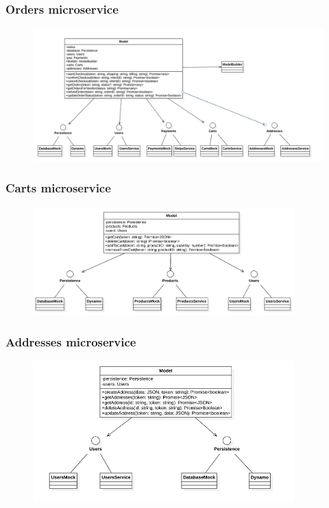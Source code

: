 \subsubsection{Orders microservice}
\begin{figure}[H]
    \includegraphics[width=\textwidth]{res/images/class-diagrams/orders.png}
\end{figure}

\subsubsection{Carts microservice}
\begin{figure}[H]
    \includegraphics[width=0.9\textwidth]{res/images/class-diagrams/carts.png}
\end{figure}

\subsubsection{Addresses microservice}
\begin{figure}[H]
    \includegraphics[width=0.9\textwidth]{res/images/class-diagrams/addresses.png}
\end{figure}


